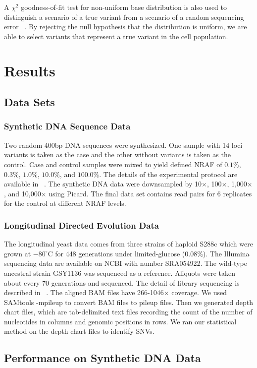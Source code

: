 \documentclass[11pt,reqno]{amsart}
\begin{document}
A $\chi^2$ goodness-of-fit test for non-uniform base distribution is also used to distinguish a scenario of a true variant from a scenario of a random sequencing error ~\citep{efron2010large, he2015rvd2}.
By rejecting the null hypothesis that the distribution is uniform, we are able to select variants that represent a true variant in the cell population.
\section{Results}
\subsection{Data Sets}
\subsubsection{Synthetic DNA Sequence Data}
Two random 400bp DNA sequences were synthesized. One sample with 14 loci variants is taken as the case and the other without variants is taken as the control.
Case and control samples were mixed to yield defined NRAF of $0.1\%$, $0.3\%$, $1.0\%$, $10.0\%$, and $100.0\%$.
The details of the experimental protocol are available in ~\citep{flaherty2011ultrasensitive}.
The synthetic DNA data were downsampled by 10$\times$, 100$\times$, 1,000$\times$, and 10,000$\times$ using Picard.
The final data set contains read pairs for 6 replicates for the control at different NRAF levels.
\subsubsection{Longitudinal Directed Evolution Data}
The longitudinal yeast data comes from three strains of haploid S288c which were grown at $-80^{\circ }\textrm{C}$ for 448 generations under limited-glucose (0.08$\%$).
The Illumina sequencing data are available on NCBI with number SRA054922.
The wild-type ancestral strain GSY1136 was sequenced as a reference.
Aliquots were taken about every 70 generations and sequenced.
The detail of library sequencing is described in ~\citep{kvitek2013whole, kao2008molecular}.
The aligned BAM files have 266-1046$\times$ coverage.
We used SAMtools -mpileup to convert BAM files to pileup files.
Then we generated depth chart files, which are tab-delimited text files recording the count of the number of nucleotides in columns and genomic positions in rows.
We ran our statistical method on the depth chart files to identify SNVs.
\subsection{Performance on Synthetic DNA Data}
\end{document}
